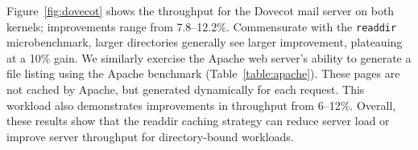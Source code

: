 Figure~\ref{fig:dovecot} shows the throughput for the 
Dovecot mail server on both kernels; improvements range from 7.8--12.2\%.
Commensurate with the {\tt readdir} microbenchmark, larger directories 
generally see larger improvement, plateauing at a 10\% gain.
We similarly exercise the Apache web server's ability to generate a file listing using the Apache benchmark (Table~\ref{table:apache}).
These pages are not cached by Apache, but generated dynamically for each request.
This workload also demonstrates improvements in throughput from 6--12\%.
Overall, these results show that the readdir caching strategy can reduce server load
or improve server throughput for directory-bound workloads.

